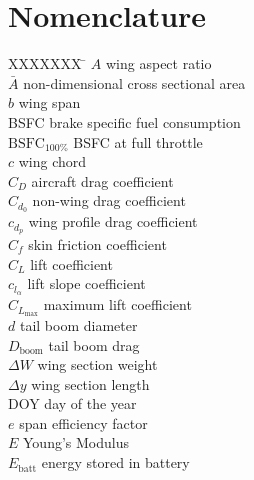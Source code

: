 
\chapter*{Nomenclature}

\begin{tabbing}
  XXXXXXX \= \kill%
$A$ \> wing aspect ratio \\
$\bar{A}$ \> non-dimensional cross sectional area \\
$b$ \> wing span \\ %
BSFC \> brake specific fuel consumption \\ %
$\text{BSFC}_{100\%}$ \> BSFC at full throttle \\ %
$c$ \> wing chord \\ %
$C_D$ \> aircraft drag coefficient \\
$C_{d_0}$ \> non-wing drag coefficient \\
$c_{d_p}$ \> wing profile drag coefficient \\
$C_f$ \> skin friction coefficient \\
$C_L$ \> lift coefficient \\
$c_{l_{\alpha}}$ \> lift slope coefficient \\
$C_{L_{\text{max}}}$ \> maximum lift coefficient \\
$d$ \> tail boom diameter \\ %
$D_{\text{boom}}$ \> tail boom drag \\%
$\Delta W$ \> wing section weight \\ %
$\Delta y$ \> wing section length \\ %
DOY \> day of the year \\
$e$ \> span efficiency factor \\
$E$ \> Young's Modulus \\ %
$E_{\text{batt}}$ \> energy stored in battery \\ %

\end{tabbing}
